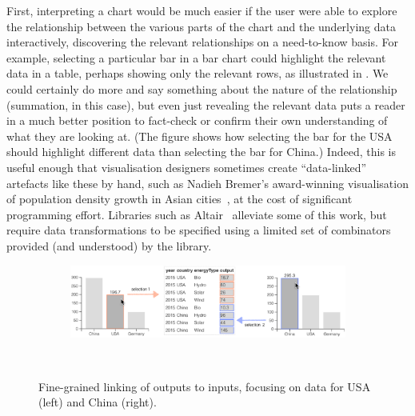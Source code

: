 First, interpreting a chart would be much easier if the user were able to explore the relationship between the various parts of the chart and the underlying data interactively, discovering the relevant relationships on a need-to-know basis. For example, selecting a particular bar in a bar chart could highlight the relevant data in a table, perhaps showing only the relevant rows, as illustrated in . We could certainly do more and say something about the nature of the relationship (summation, in this case), but even just revealing the relevant data puts a reader in a much better position to fact-check or confirm their own understanding of what they are looking at. (The figure shows how selecting the bar for the USA should highlight different data than selecting the bar for China.) Indeed, this is useful enough that visualisation designers sometimes create ``data-linked'' artefacts like these by hand, such as Nadieh Bremer's award-winning visualisation of population density growth in Asian cities~\cite{bremer15}, at the cost of significant programming effort. Libraries such as Altair~\cite{vanderPlas18} alleviate some of this work, but require data transformations to be specified using a limited set of combinators provided (and understood) by the library.

\begin{figure}
   \begin{subfigure}[b]{0.99\textwidth}
      \centering
      {\includegraphics[scale=0.55]{fig/example/data-linking-merged.png}}
   \end{subfigure}\\
   \vspace{2mm}
   \begin{subfigure}{0.65\textwidth}
      \small
      
   \end{subfigure}
   \caption{Fine-grained linking of outputs to inputs, focusing on data for USA (left) and China (right).}
   \label{fig:introduction:data-linking}
\end{figure}

